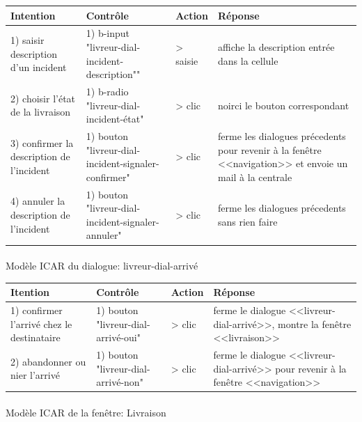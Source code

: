 \documentclass{report}
\begin{document}
\begin{longtable}{|p{3cm}|p{4cm}|p{2cm}|p{5cm}|}
\hline
Intention&Contrôle&Action&Réponse\\\hline
1) saisir description d'un incident&1) b-input \newline
"livreur-dial-incident-description""&> saisie&affiche la description entrée dans la cellule\\\hline
2) choisir l'état de la livraison&1) b-radio \newline
"livreur-dial-incident-état"&> clic&noirci le bouton correspondant\\\hline
3) confirmer la description de l'incident&1) bouton \newline
"livreur-dial-incident-signaler-confirmer"&> clic&ferme les dialogues précedents pour revenir à la fenêtre <<navigation>> et envoie un mail à la centrale\\\hline
4) annuler la description de l'incident&1) bouton \newline
"livreur-dial-incident-signaler-annuler"&> clic&ferme les dialogues précedents sans rien faire\\\hline
\end{longtable}


\paragraph{}
Modèle ICAR du dialogue: livreur-dial-arrivé

\begin{longtable}{|p{3cm}|p{4cm}|p{2cm}|p{5cm}|}
\hline
Itention&Contrôle&Action&Réponse\\\hline
1) confirmer l'arrivé chez le destinataire&1) bouton \newline
"livreur-dial-arrivé-oui"&> clic&ferme le dialogue <<livreur-dial-arrivé>>, montre la fenêtre <<livraison>>\\\hline
2) abandonner ou nier l'arrivé&1) bouton \newline
"livreur-dial-arrivé-non"&> clic&ferme le dialogue <<livreur-dial-arrivé>> pour revenir à la fenêtre <<navigation>>\\\hline
\end{longtable}


\paragraph{}
Modèle ICAR de la fenêtre: Livraison
\end{document}
